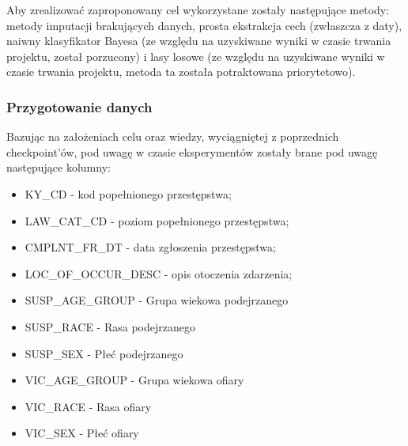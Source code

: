 \documentclass{classrep}
\begin{document}
{{{                Aby zrealizować zaproponowany cel wykorzystane zostały następujące metody:
                metody imputacji brakujących danych, prosta ekstrakcja cech (zwłaszcza z
                daty), naiwny klasyfikator Bayesa (ze względu na uzyskiwane wyniki w
                czasie trwania projektu, został porzucony) i lasy losowe (ze względu na
                uzyskiwane wyniki w czasie trwania projektu, metoda ta została
                potraktowana priorytetowo).

            }

            \subsubsection{Przygotowanie danych} {
                Bazując na założeniach celu oraz wiedzy, wyciągniętej z poprzednich
                checkpoint'ów, pod uwagę w czasie eksperymentów zostały brane pod uwagę
                następujące kolumny:
                \begin{itemize}
                    \item KY\_CD - kod popełnionego przestępstwa;
                    \item LAW\_CAT\_CD - poziom popełnionego przestępstwa;
                    \item CMPLNT\_FR\_DT - data zgłoszenia przestępstwa;
                    \item LOC\_OF\_OCCUR\_DESC - opis otoczenia zdarzenia;
                    \item SUSP\_AGE\_GROUP - Grupa wiekowa podejrzanego
                    \item SUSP\_RACE - Rasa podejrzanego
                    \item SUSP\_SEX - Płeć podejrzanego
                    \item VIC\_AGE\_GROUP - Grupa wiekowa ofiary
                    \item VIC\_RACE - Rasa ofiary
                    \item VIC\_SEX - Płeć ofiary
                \end{itemize}

}}}
\end{document}
